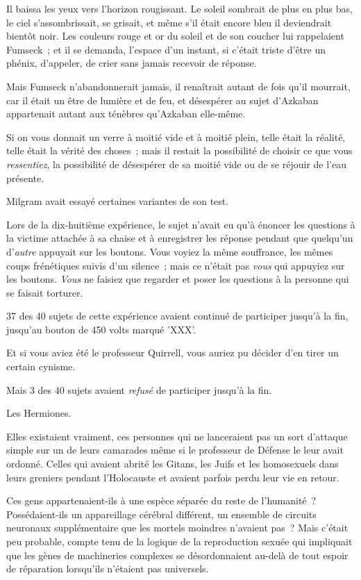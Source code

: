Il baissa les yeux vers l'horizon rougissant. Le soleil sombrait de plus en plus bas, le ciel s'assombrissait, se grisait, et même s'il était encore bleu il deviendrait bientôt noir. Les couleurs rouge et or du soleil et de son coucher lui rappelaient Fumseck~; et il se demanda, l'espace d'un instant, si c'était triste d'être un phénix, d'appeler, de crier sans jamais recevoir de réponse.

Mais Fumseck n'abandonnerait jamais, il renaîtrait autant de fois qu'il mourrait, car il était un être de lumière et de feu, et désespérer au sujet d'Azkaban appartenait autant aux ténèbres qu'Azkaban elle-même.

Si on vous donnait un verre à moitié vide et à moitié plein, telle était la réalité, telle était la vérité des choses~; mais il restait la possibilité de choisir ce que vous \emph{ressentiez}, la possibilité de désespérer de sa moitié vide ou de se réjouir de l'eau présente.

Milgram avait essayé certaines variantes de son test.

Lors de la dix-huitième expérience, le sujet n'avait eu qu'à énoncer les questions à la victime attachée à sa chaise et à enregistrer les réponse pendant que quelqu'un d'\emph{autre} appuyait sur les boutons. Vous voyiez la même souffrance, les mêmes coups frénétiques suivis d'un silence~; mais ce n'était pas \emph{vous} qui appuyiez sur les boutons. \emph{Vous} ne faisiez que regarder et poser les questions à la personne qui se faisait torturer.

37 des 40 sujets de cette expérience avaient continué de participer jusqu'à la fin, jusqu'au bouton de 450 volts marqué 'XXX'.

Et si vous aviez été le professeur Quirrell, vous auriez pu décider d'en tirer un certain cynisme.

Mais 3 des 40 sujets avaient \emph{refusé} de participer jusqu'à la fin.

Les Hermiones.

Elles existaient vraiment, ces personnes qui ne lanceraient pas un sort d'attaque simple sur un de leurs camarades même si le professeur de Défense le leur avait ordonné. Celles qui avaient abrité les Gitans, les Juifs et les homosexuels dans leurs greniers pendant l'Holocauste et avaient parfois perdu leur vie en retour.

Ces gens appartenaient-ils à une espèce séparée du reste de l'humanité~? Possédaient-ils un appareillage cérébral différent, un ensemble de circuits neuronaux supplémentaire que les mortels moindres n'avaient pas~? Mais c'était peu probable, compte tenu de la logique de la reproduction sexuée qui impliquait que les gènes de machineries complexes se désordonnaient au-delà de tout espoir de réparation lorsqu'ils n'étaient pas universels.

